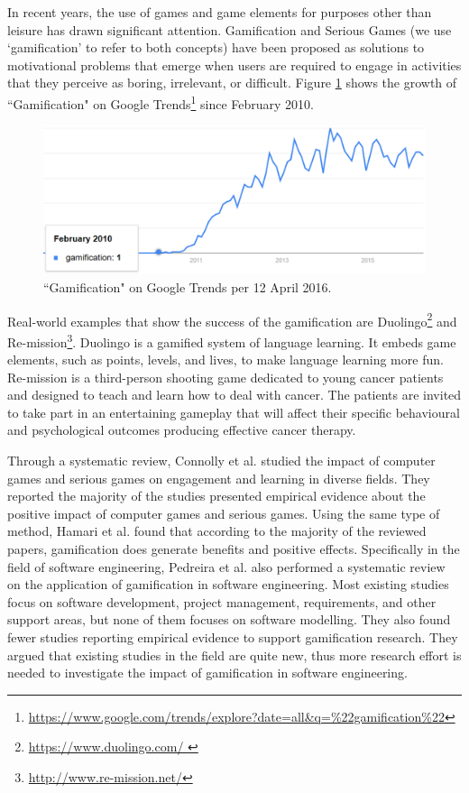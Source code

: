 \documentclass[12pt, a4paper]{report}
\begin{document}
In recent years, the use of games and game elements for purposes other than leisure has drawn significant attention. Gamification \cite{deterding2011game} and Serious Games \cite{Michael2005} (we use `gamification' to refer to both concepts) have been proposed as solutions to motivational problems that emerge when users are required to engage in activities that they perceive as boring, irrelevant, or difficult. Figure \ref{gamification-trend} shows the growth of ``Gamification" on Google Trends\footnote{\url{https://www.google.com/trends/explore?date=all&q=\%22gamification\%22}} since February 2010. 

\begin{figure}[ht]
\centering
\includegraphics[width=12cm]{gamification-trend}
\caption{``Gamification" on Google Trends per 12 April 2016.}
\label{gamification-trend}
\end{figure}

Real-world examples that show the success of the gamification are Duolingo\footnote{\url{https://www.duolingo.com/
}} and Re-mission\footnote{\url{http://www.re-mission.net/}}. Duolingo is a gamified system of language learning. It embeds game elements, such as points, levels, and lives, to make language learning more fun. Re-mission is a third-person shooting game dedicated to young cancer patients and designed to teach and learn how to deal with cancer. The patients are invited to take part in an entertaining gameplay that will affect their specific behavioural and psychological outcomes producing effective cancer therapy.
 
Through a systematic review, Connolly et al. \cite{connolly2012systematic} studied the impact of computer games and serious games on engagement and learning in diverse fields. They reported the majority of the studies presented empirical evidence about the positive impact of computer games and serious games. Using the same type of method, Hamari et al. \cite{hamari2014does} found that according to the majority of the reviewed papers, gamification does generate benefits and positive effects. Specifically in the field of software engineering, Pedreira et al. \cite{Pedreira2015} also performed a systematic review on the application of gamification in software engineering. Most existing studies focus on software development, project management, requirements, and other support areas, but none of them focuses on software modelling. They also found fewer studies reporting empirical evidence to support gamification research. They argued that existing studies in the field are quite new, thus more research effort is needed to investigate the impact of gamiﬁcation in software engineering. 
\end{document}
